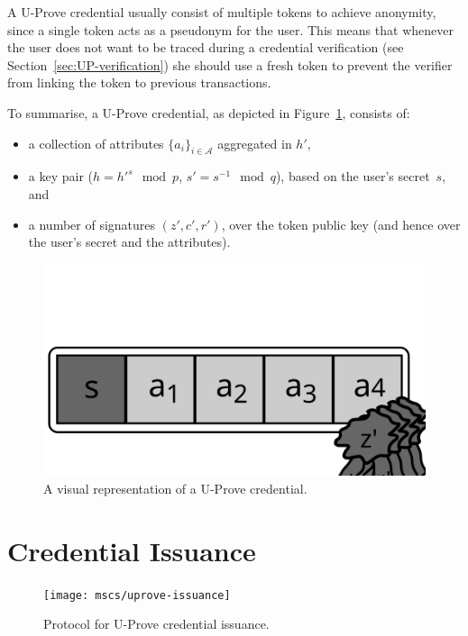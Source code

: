 A U-Prove credential usually consist of multiple tokens to achieve anonymity,
since a single token acts as a pseudonym for the user. This means that whenever
the user does not want to be traced during a credential verification (see
Section~\ref{sec:UP-verification}) she should use a fresh token to prevent the
verifier from linking the token to previous transactions.

To summarise, a U-Prove credential, as depicted in
Figure~\ref{fig:uprove-credential}, consists of:
\begin{itemize}
  \item a collection of attributes $\{a_i\}_{i \in \mathcal{A}}$ aggregated in $h'$,
  \item a key pair ($h = h'^s \mod p$, $s' = s^{-1} \mod q$), based on the user's secret~$s$, and
  \item a number of signatures $(z', c', r')$, over the token public key (and hence over the user's secret and the attributes).
\end{itemize}
\begin{figure}[H]
  \centering
  \includegraphics[scale=.45]{images/uprove-credential}
  \caption{A visual representation of a U-Prove credential.}
  \label{fig:uprove-credential}
\end{figure}

\section{Credential Issuance}\label{sec:UP-issuance}

\begin{figure}[ht]
  \centering
  \texttt{[image: mscs/uprove-issuance]}
  \caption{Protocol for U-Prove credential issuance.}
  \label{msc:uprove-issuance}
\end{figure}

